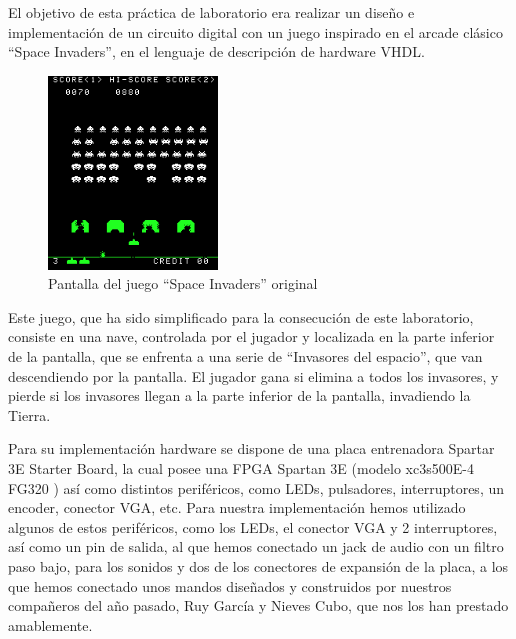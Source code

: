 \label{introduction}

El objetivo de esta práctica de laboratorio era realizar un diseño e implementación de un circuito digital con un juego inspirado en el arcade clásico ``Space Invaders'', en el lenguaje de descripción de hardware VHDL.

\begin{figure}[H]
	\centering
	\includegraphics[width=0.4\textwidth]{SpaceInvaders-Gameplay.png}
	\caption{Pantalla del juego ``Space Invaders'' original }\label{fig:originalInvaders}
\end{figure}

Este juego, que ha sido simplificado para la consecución de este laboratorio, consiste en una nave, controlada por el jugador y localizada en la parte inferior de la pantalla, que se enfrenta a una serie de ``Invasores del espacio'', que van descendiendo por la pantalla. El jugador gana si elimina a todos los invasores, y pierde si los invasores llegan a la parte inferior de la pantalla, invadiendo la Tierra.

Para su implementación hardware se dispone de una placa entrenadora Spartar 3E Starter Board, la cual posee una FPGA Spartan 3E (modelo xc3s500E-4 FG320 ) así como distintos periféricos, como LEDs, pulsadores, interruptores, un encoder, conector VGA, etc. Para nuestra implementación hemos utilizado algunos de estos periféricos, como los LEDs, el conector VGA y 2 interruptores, así como un pin de salida, al que hemos conectado un jack de audio con un filtro paso bajo, para los sonidos y dos de los conectores de expansión de la placa, a los que hemos conectado unos mandos diseñados y construidos por nuestros compañeros del año pasado, Ruy García y Nieves Cubo, que nos los han prestado amablemente.

\newpage